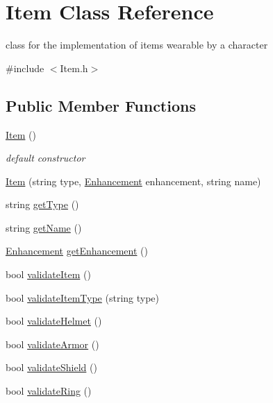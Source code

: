 \hypertarget{class_item}{}\section{Item Class Reference}
\label{class_item}


class for the implementation of items wearable by a character  




{\ttfamily \#include $<$Item.\+h$>$}

\subsection*{Public Member Functions}
\begin{DoxyCompactItemize}
\item 
\hypertarget{class_item_a297720c02984eab37332ae795d22189d}{}\label{class_item_a297720c02984eab37332ae795d22189d} 
\hyperlink{class_item_a297720c02984eab37332ae795d22189d}{Item} ()
\begin{DoxyCompactList}\small\item\em default constructor \end{DoxyCompactList}\item 
\hyperlink{class_item_acbc343f7e61d21ae704ef4174c719604}{Item} (string type, \hyperlink{class_enhancement}{Enhancement} enhancement, string name)
\item 
string \hyperlink{class_item_a2aea1cc560205b01eaf5250c21f4fc71}{get\+Type} ()
\item 
string \hyperlink{class_item_a63d7f2148b699e539aae354b01559811}{get\+Name} ()
\item 
\hyperlink{class_enhancement}{Enhancement} \hyperlink{class_item_a267a70ef319464175269993003c6448d}{get\+Enhancement} ()
\item 
bool \hyperlink{class_item_a6603371b60aaded48f697975c81fc25b}{validate\+Item} ()
\item 
bool \hyperlink{class_item_ad4a931d5e2a5f05252948432bea57985}{validate\+Item\+Type} (string type)
\item 
bool \hyperlink{class_item_aa8ddc87ca9c68d3e5425c7de4fd731d6}{validate\+Helmet} ()
\item 
bool \hyperlink{class_item_a67c7da153ee5b7346c9ed2f85153f5cb}{validate\+Armor} ()
\item 
bool \hyperlink{class_item_ad5c772d7c46c965fc589cf571bb9c315}{validate\+Shield} ()
\item 
bool \hyperlink{class_item_a4a27008a17c7de44a94a84badc6010ca}{validate\+Ring} ()

\end{DoxyCompactItemize}
